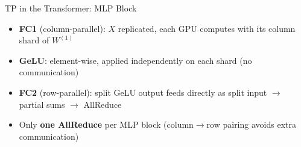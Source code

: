 \begin{frame}{TP in the Transformer: MLP Block}
  \vspace{0.1em}
  \begin{itemize}\small
    \item \textbf{FC1} (column-parallel): $X$ replicated, each GPU computes with its column shard of $W^{(1)}$
    \item \textbf{GeLU}: element-wise, applied independently on each shard (no communication)
    \item \textbf{FC2} (row-parallel): split GeLU output feeds directly as split input $\to$ partial sums $\to$ AllReduce
    \item Only \textbf{one AllReduce} per MLP block (column$\to$row pairing avoids extra communication)
  \end{itemize}
\end{frame}

